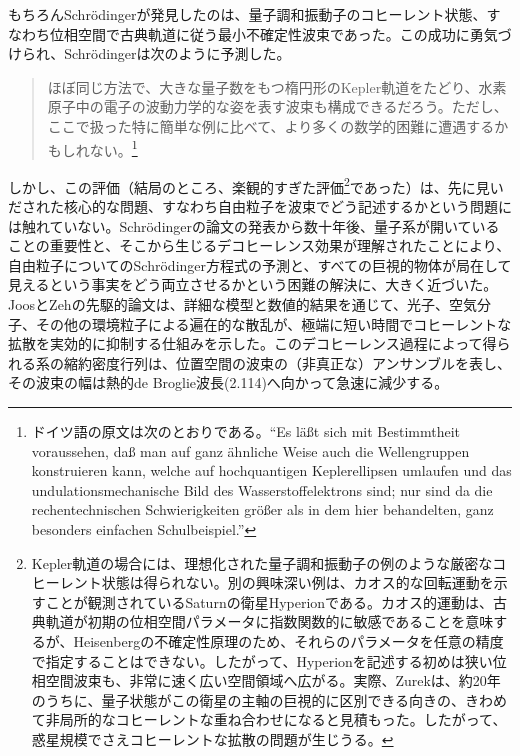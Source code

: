 もちろんSchrödingerが発見したのは、量子調和振動子のコヒーレント状態、すなわち位相空間で古典軌道に従う最小不確定性波束であった。この成功に勇気づけられ、Schrödingerは次のように予測した\cite[p.~666]{ref157}。
\begin{quote}
ほぼ同じ方法で、大きな量子数をもつ楕円形のKepler軌道をたどり、水素原子中の電子の波動力学的な姿を表す波束も構成できるだろう。ただし、ここで扱った特に簡単な例に比べて、より多くの数学的困難に遭遇するかもしれない。\footnote{ドイツ語の原文は次のとおりである。``Es läßt sich mit Bestimmtheit voraussehen, daß man auf ganz ähnliche Weise auch die Wellengruppen konstruieren kann, welche auf hochquantigen Keplerellipsen umlaufen und das undulationsmechanische Bild des Wasserstoffelektrons sind; nur sind da die rechentechnischen Schwierigkeiten größer als in dem hier behandelten, ganz besonders einfachen Schulbeispiel.''}
\end{quote}

\hypertarget{srcpage:118}{}\label{srcpage:118}
しかし、この評価（結局のところ、楽観的すぎた評価\footnote{Kepler軌道の場合には、理想化された量子調和振動子の例のような厳密なコヒーレント状態は得られない。別の興味深い例は、カオス的な回転運動を示すことが観測されているSaturnの衛星Hyperionである。カオス的運動は、古典軌道が初期の位相空間パラメータに指数関数的に敏感であることを意味するが、Heisenbergの不確定性原理のため、それらのパラメータを任意の精度で指定することはできない。したがって、Hyperionを記述する初めは狭い位相空間波束も、非常に速く広い空間領域へ広がる。実際、Zurek\cite{ref158}は、約20年のうちに、量子状態がこの衛星の主軸の巨視的に区別できる向きの、きわめて非局所的なコヒーレントな重ね合わせになると見積もった。したがって、惑星規模でさえコヒーレントな拡散の問題が生じうる。}であった）は、先に見いだされた核心的な問題、すなわち自由粒子を波束でどう記述するかという問題には触れていない。Schrödingerの論文の発表から数十年後、量子系が開いていることの重要性と、そこから生じるデコヒーレンス効果が理解されたこと\cite{ref004,ref005,ref006,ref008,ref009,ref012}により、自由粒子についてのSchrödinger方程式の予測と、すべての巨視的物体が局在して見えるという事実をどう両立させるかという困難の解決に、大きく近づいた。JoosとZehの先駆的論文\cite{ref007}は、詳細な模型と数値的結果を通じて、光子、空気分子、その他の環境粒子による遍在的な散乱が、極端に短い時間でコヒーレントな拡散を実効的に抑制する仕組みを示した。このデコヒーレンス過程によって得られる系の縮約密度行列は、位置空間の波束の（非真正な）アンサンブルを表し、その波束の幅は熱的de Broglie波長(2.114)へ向かって急速に減少する。

